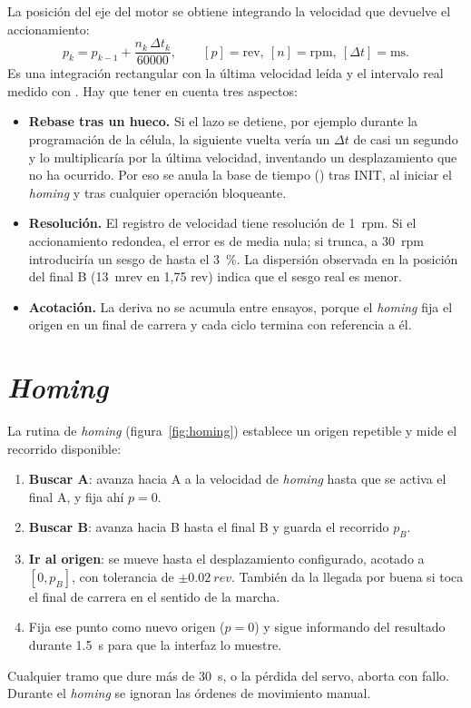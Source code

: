 La posición del eje del motor se obtiene integrando la velocidad que devuelve el accionamiento:
\begin{equation}
  p_k = p_{k-1} + \frac{n_k\,\Delta t_k}{60000}, \qquad [p]=\text{rev},\ [n]=\text{rpm},\ [\Delta t]=\text{ms}.
\end{equation}
Es una integración rectangular con la última velocidad leída y el intervalo real medido con
. Hay que tener en cuenta tres aspectos:
\begin{itemize}
  \item \textbf{Rebase tras un hueco.} Si el lazo se detiene, por ejemplo durante la programación de la
        célula, la siguiente vuelta vería un $\Delta t$ de casi un segundo y lo multiplicaría por la
        última velocidad, inventando un desplazamiento que no ha ocurrido. Por eso se anula la base de
        tiempo () tras INIT, al iniciar el \emph{homing} y tras cualquier
        operación bloqueante.
  \item \textbf{Resolución.} El registro de velocidad tiene resolución de \SI{1}{rpm}. Si el
        accionamiento redondea, el error es de media nula; si trunca, a \SI{30}{rpm} introduciría un
        sesgo de hasta el \SI{3}{\percent}. La dispersión observada en la posición del final B
        (\SI{13}{mrev} en 1,75 rev) indica que el sesgo real es menor.
  \item \textbf{Acotación.} La deriva no se acumula entre ensayos, porque el \emph{homing} fija el
        origen en un final de carrera y cada ciclo termina con referencia a él.
\end{itemize}

\section{\emph{Homing}}

La rutina de \emph{homing} (figura~\ref{fig:homing}) establece un origen repetible y mide el recorrido
disponible:
\begin{enumerate}
  \item \textbf{Buscar A}: avanza hacia A a la velocidad de \emph{homing} hasta que se activa el final
        A, y fija ahí $p=0$.
  \item \textbf{Buscar B}: avanza hacia B hasta el final B y guarda el recorrido $p_B$.
  \item \textbf{Ir al origen}: se mueve hasta el desplazamiento configurado, acotado a $[0, p_B]$, con
        tolerancia de $\pm\SI{0.02}{rev}$. También da la llegada por buena si toca el final de carrera
        en el sentido de la marcha.
  \item Fija ese punto como nuevo origen ($p=0$) y sigue informando del resultado durante
        \SI{1.5}{\second} para que la interfaz lo muestre.
\end{enumerate}
Cualquier tramo que dure más de \SI{30}{\second}, o la pérdida del servo, aborta con fallo. Durante el
\emph{homing} se ignoran las órdenes de movimiento manual.

